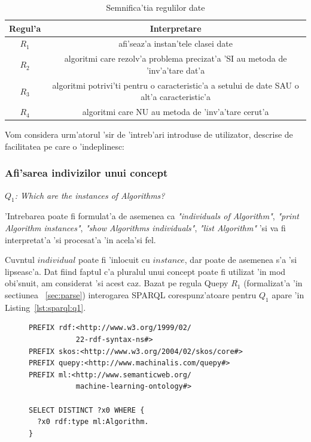 \documentclass[12pt,a4paper,twoside]{report}
\begin{document}
\begin{table}[]
    \centering
    \begin{tabular}{|c|c|}
    \hline \hline
      Regul'a & Interpretare\\[0.5ex] \hline 
     $R_1$ & afi'seaz'a instan'tele clasei date \\[1ex]
  $R_2$ & algoritmi care rezolv'a problema precizat'a 'SI au metoda de 'inv'a'tare dat'a\\[1ex]
  $R_3$ & algoritmi potrivi'ti pentru o caracteristic'a a setului de date SAU o alt'a caracteristic'a\\[1ex]
  $R_4$ & algoritmi care NU au metoda de 'inv'a'tare cerut'a\\[1ex]
  \hline
    \end{tabular}
    \caption{Semnifica'tia regulilor date}
    \label{tab:rules}
\end{table}

Vom considera urm'atorul 'sir de 'intreb'ari introduse de utilizator, descrise de facilitatea pe care o 'indeplinesc:

\subsubsection{Afi'sarea indivizilor unui concept}
\begin{center}
{\it $Q_1$: Which are the instances of Algorithms?}
\end{center}

'Intrebarea poate fi formulat'a de asemenea ca {\it"individuals of Algorithm"},
       {\it "print Algorithm instances"},
       {\it "show Algorithms individuals"},
        {\it"list Algorithm"} 'si va fi interpretat'a 'si procesat'a 'in acela'si fel.
        
Cuv\ia ntul $individual$ poate fi 'inlocuit cu $instance$, dar poate de asemenea s'a 'si lipseasc'a. Dat fiind faptul c'a pluralul unui concept poate fi utilizat 'in mod obi'snuit, am considerat 'si acest caz.
Bazat pe regula Quepy $R_1$ (formalizat'a 'in sectiunea ~\ref{sec:parse}) interogarea SPARQL corespunz'atoare pentru $Q_1$ apare 'in Listing~\ref{lst:sparql:q1}.

\begin{figure}
\begin{footnotesize}
\begin{lstlisting}[captionpos=b, caption=Formalizarea SPARQL a interog'arii $Q_1$., label=lst:sparql:q1,
   basicstyle=\ttfamily,frame=single]
PREFIX rdf:<http://www.w3.org/1999/02/
           22-rdf-syntax-ns#>
PREFIX skos:<http://www.w3.org/2004/02/skos/core#>
PREFIX quepy:<http://www.machinalis.com/quepy#>
PREFIX ml:<http://www.semanticweb.org/
           machine-learning-ontology#>

SELECT DISTINCT ?x0 WHERE {
  ?x0 rdf:type ml:Algorithm.
}
\end{lstlisting}
\end{footnotesize}
\end{figure}
\end{document}
